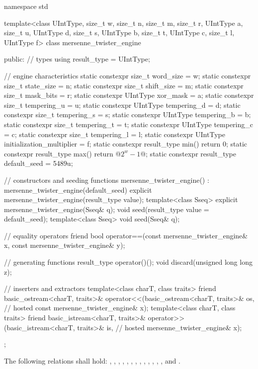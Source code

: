 %
%
\begin{codeblock}
namespace std {
  template<class UIntType, size_t w, size_t n, size_t m, size_t r,
           UIntType a, size_t u, UIntType d, size_t s,
           UIntType b, size_t t,
           UIntType c, size_t l, UIntType f>
  class mersenne_twister_engine {
  public:
    // types
    using result_type = UIntType;

    // engine characteristics
    static constexpr size_t word_size = w;
    static constexpr size_t state_size = n;
    static constexpr size_t shift_size = m;
    static constexpr size_t mask_bits = r;
    static constexpr UIntType xor_mask = a;
    static constexpr size_t tempering_u = u;
    static constexpr UIntType tempering_d = d;
    static constexpr size_t tempering_s = s;
    static constexpr UIntType tempering_b = b;
    static constexpr size_t tempering_t = t;
    static constexpr UIntType tempering_c = c;
    static constexpr size_t tempering_l = l;
    static constexpr UIntType initialization_multiplier = f;
    static constexpr result_type min() { return 0; }
    static constexpr result_type max() { return  @$2^w - 1$@; }
    static constexpr result_type default_seed = 5489u;

    // constructors and seeding functions
    mersenne_twister_engine() : mersenne_twister_engine(default_seed) {}
    explicit mersenne_twister_engine(result_type value);
    template<class Sseq> explicit mersenne_twister_engine(Sseq& q);
    void seed(result_type value = default_seed);
    template<class Sseq> void seed(Sseq& q);

    // equality operators
    friend bool operator==(const mersenne_twister_engine& x, const mersenne_twister_engine& y);

    // generating functions
    result_type operator()();
    void discard(unsigned long long z);

    // inserters and extractors
    template<class charT, class traits>
      friend basic_ostream<charT, traits>&
        operator<<(basic_ostream<charT, traits>& os,            // hosted
                   const mersenne_twister_engine& x);
    template<class charT, class traits>
      friend basic_istream<charT, traits>&
        operator>>(basic_istream<charT, traits>& is,            // hosted
                   mersenne_twister_engine& x);
  };
}
\end{codeblock}

\pnum
The following relations shall hold:
  ,
  ,
  ,
  ,
  ,
  ,
  ,
  ,
  ,
  ,
  ,
  ,
  ,
and
  .

